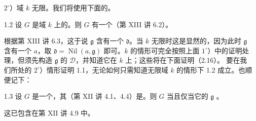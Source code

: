 $2^\circ$）域 $k$ 无限。我们将使用下面的。
\begin{SGAresult}{}{1.2}
设 $G$ 是域 $k$ 上的。则 $G$ 有一个（第 XIII 讲 6.2）。
\end{SGAresult}
根据第 XIII 讲 6.3，这于说 $\mathfrak g$ 含有一个 $\mathfrak d$。当 $k$ 无限时这是显然的，因为此时 $\mathfrak g$ 含有一个 $a$，取 $\mathfrak d=\operatorname{Nil}(a,\mathfrak g)$ 即可。$k$ 的情形可完全按照上面 $1^\circ$）中的证明处理，但须先构造 $\mathfrak g$ 的 $\mathcal D$，并知道它在 $k$ 上；这些将在下面证明（2.16）。
要在我们所处的 $2^\circ$）情形证明 1.1，无论如何只需知道无限域 $k$ 的情形下 1.2 成立。也顺便记下：
\begin{SGAresult}{}{1.3}
设 $G$ 是一个，其（第 XII 讲 4.1、4.4）是。则 $G$ 当且仅当它的 $\mathfrak g$ 。
\end{SGAresult}
这已包含在第 XII 讲 4.9 中。

